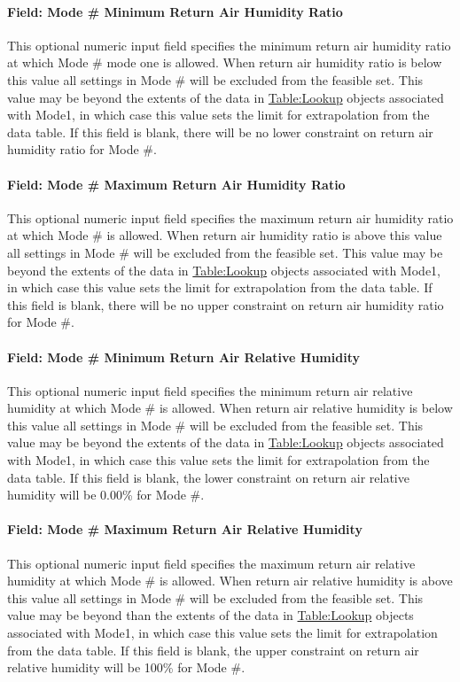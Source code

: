 \paragraph{Field: Mode \# Minimum Return Air Humidity Ratio}
This optional numeric input field specifies the minimum return air humidity ratio at which Mode \# mode one is allowed. When return air humidity ratio is below this value all settings in Mode \# will be excluded from the feasible set. This value may be beyond the extents of the data in \hyperref[tablelookup]{Table:Lookup} objects associated with Mode1, in which case this value sets the limit for extrapolation from the data table. If this field is blank, there will be no lower constraint on return air humidity ratio for Mode \#.

\paragraph{Field: Mode \# Maximum Return Air Humidity Ratio}
This optional numeric input field specifies the maximum return air humidity ratio at which Mode \# is allowed. When return air humidity ratio is above this value all settings in Mode \# will be excluded from the feasible set. This value may be beyond the extents of the data in \hyperref[tablelookup]{Table:Lookup} objects associated with Mode1, in which case this value sets the limit for extrapolation from the data table. If this field is blank, there will be no upper constraint on return air humidity ratio for Mode \#.

\paragraph{Field: Mode \# Minimum Return Air Relative Humidity}
This optional numeric input field specifies the minimum return air relative humidity at which Mode \# is allowed. When return air relative humidity is below this value all settings in Mode \# will be excluded from the feasible set. This value may be beyond the extents of the data in \hyperref[tablelookup]{Table:Lookup} objects associated with Mode1, in which case this value sets the limit for extrapolation from the data table. If this field is blank, the lower constraint on return air relative humidity will be 0.00\% for Mode \#.

\paragraph{Field: Mode \# Maximum Return Air Relative Humidity}
This optional numeric input field specifies the maximum return air relative humidity at which Mode \# is allowed. When return air relative humidity is above this value all settings in Mode \# will be excluded from the feasible set. This value may be beyond than the extents of the data in \hyperref[tablelookup]{Table:Lookup} objects associated with Mode1, in which case this value sets the limit for extrapolation from the data table. If this field is blank, the upper constraint on return air relative humidity will be 100\% for Mode \#.

